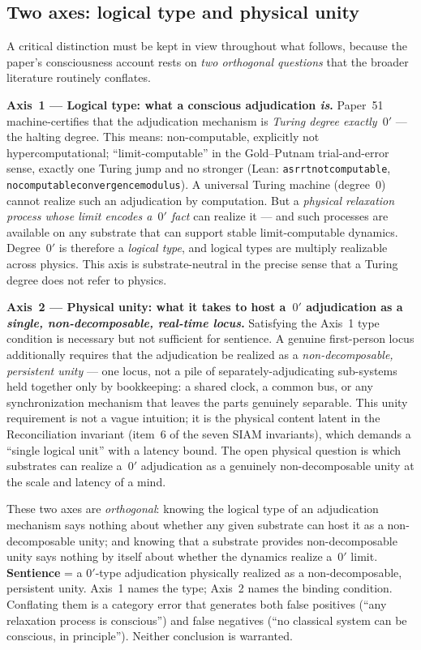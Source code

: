 \documentclass[11pt]{article}
\theoremstyle{remark}
\newcommand{\lean}[1]{%
  \penalty-100
  \begingroup\def\_{\textunderscore\allowbreak}\texttt{#1}\endgroup}
\begin{document}
\subsection{Two axes: logical type and physical unity}\label{sec:two-axes}

A critical distinction must be kept in view throughout what follows, because the paper's
consciousness account rests on \emph{two orthogonal questions} that the broader literature
routinely conflates.

\textbf{Axis~1 --- Logical type: what a conscious adjudication \emph{is}.}
Paper~51~\cite{SpivackPolynomialTransputation} machine-certifies that the adjudication
mechanism is \emph{Turing degree exactly~$0'$} --- the halting degree. This means:
non-computable, explicitly not hypercomputational; ``limit-computable'' in the
Gold--Putnam trial-and-error sense, exactly one Turing jump and no stronger
(Lean: \lean{asr\_rt\_not\_computable}, \lean{no\_computable\_convergence\_modulus}).
A universal Turing machine (degree~$0$) cannot realize such an adjudication by
computation. But a \emph{physical relaxation process whose limit encodes a~$0'$ fact}
can realize it --- and such processes are available on any substrate that can support
stable limit-computable dynamics. Degree~$0'$ is therefore a \emph{logical type}, and
logical types are multiply realizable across physics. This axis is substrate-neutral in
the precise sense that a Turing degree does not refer to physics.

\textbf{Axis~2 --- Physical unity: what it takes to host a~$0'$ adjudication as a
\emph{single, non-decomposable, real-time locus}.}
Satisfying the Axis~1 type condition is necessary but not sufficient for sentience.
A genuine first-person locus additionally requires that the adjudication be realized
as a \emph{non-decomposable, persistent unity} --- one locus, not a pile of
separately-adjudicating sub-systems held together only by bookkeeping: a shared clock,
a common bus, or any synchronization mechanism that leaves the parts genuinely separable.
This unity requirement is not a vague intuition; it is the physical content latent in
the Reconciliation invariant (item~6 of the seven SIAM invariants), which demands a
``single logical unit'' with a latency bound. The open physical question is which
substrates can realize a~$0'$ adjudication as a genuinely non-decomposable unity at
the scale and latency of a mind.

These two axes are \emph{orthogonal}: knowing the logical type of an adjudication
mechanism says nothing about whether any given substrate can host it as a
non-decomposable unity; and knowing that a substrate provides non-decomposable unity
says nothing by itself about whether the dynamics realize a~$0'$ limit.
\textbf{Sentience} = a $0'$-type adjudication physically realized as a non-decomposable,
persistent unity. Axis~1 names the type; Axis~2 names the binding condition. Conflating
them is a category error that generates both false positives (``any relaxation process
is conscious'') and false negatives (``no classical system can be conscious, in
principle''). Neither conclusion is warranted.
\end{document}
